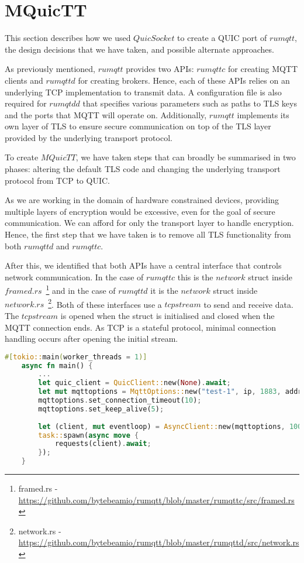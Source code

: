 \section{MQuicTT} \label{chap:port}

This section describes how we used $QuicSocket$ to create a QUIC port of $rumqtt$, the design decisions that we have taken, and possible alternate approaches.

As previously mentioned, $rumqtt$ provides two APIs: $rumqttc$ for creating MQTT clients and $rumqttd$ for creating brokers.
Hence, each of these APIs relies on an underlying TCP implementation to transmit data.
A configuration file is also required for $rumqtdd$ that specifies various parameters such as paths to TLS keys and the ports that MQTT will operate on.
Additionally, $rumqtt$ implements its own layer of TLS to ensure secure communication on top of the TLS layer provided by the underlying transport protocol.

To create $MQuicTT$, we have taken steps that can broadly be summarised in two phases: altering the default TLS code and changing the underlying transport protocol from TCP to QUIC.

As we are working in the domain of hardware constrained devices, providing multiple layers of encryption would be excessive, even for the goal of secure communication.
We can afford for only the transport layer to handle encryption.
Hence, the first step that we have taken is to remove all TLS functionality from both $rumqttd$ and $rumqttc$.

After this, we identified that both APIs have a central interface that controls network communication.
In the case of $rumqttc$ this is the $network$ struct inside $framed.rs$~\footnote{framed.rs - \url{https://github.com/bytebeamio/rumqtt/blob/master/rumqttc/src/framed.rs}} and in the case of $rumqttd$ it is the $network$ struct inside $network.rs$~\footnote{network.rs - \url{https://github.com/bytebeamio/rumqtt/blob/master/rumqttd/src/network.rs}}.
Both of these interfaces use a $tcpstream$ to send and receive data.
The $tcpstream$ is opened when the struct is initialised and closed when the MQTT connection ends.
As TCP is a stateful protocol, minimal connection handling occurs after opening the initial stream.

\begin{lstlisting}[language=Rust, caption={An example of initialising an $MQuicTT$ client. The QUIC connection is established by initialising a $QuicClient$ and the resulting client is passed as an MQTT option.}, label=lst:MQuicTT:client]
    #[tokio::main(worker_threads = 1)]
    async fn main() {
        ...
        let quic_client = QuicClient::new(None).await;
        let mut mqttoptions = MqttOptions::new("test-1", ip, 1883, addr, quic_client);
        mqttoptions.set_connection_timeout(10);
        mqttoptions.set_keep_alive(5);
    
        let (client, mut eventloop) = AsyncClient::new(mqttoptions, 100);
        task::spawn(async move {
            requests(client).await;
        });
    }
\end{lstlisting}

